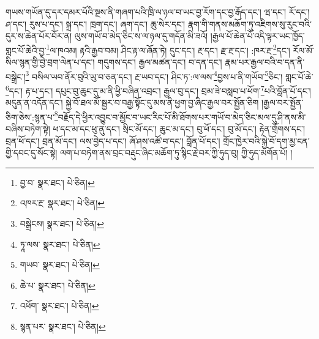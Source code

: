 གཡས་གཡོན་དུ་དར་དམར་པོའི་སྔས་ནི་གཞག་པའི་ཁྲི་ལ་ཉལ་བ་ཡང་བྱ་རོག་དང་བྱ་རྒོད་དང་། ཝ་དང་། རོ་དང་། ཤ་དང་། རུས་པ་དང་། སྐྲ་དང་། ཁྲག་དང་། ཞག་དང་། ཆུ་སེར་དང་། རྣག་གི་གནས་མཆོག་ཏུ་འཇིགས་སུ་རུང་བའི་དུར་ས་ཆེན་པོར་བོར་ན། ལུས་གཡོ་བ་མེད་ཅིང་ས་ལ་ཉལ་དུ་གདོན་མི་ཟའོ། །རྒྱལ་པོ་ཆེན་པོ་འདི་ལྟར་ཡང་ཁྱོད་གླང་པོ་ཆེའི་བྱ་\footnote{བྱ་བ་  སྣར་ཐང་།  པེ་ཅིན། }ལ་ཁའམ། རྟའི་རྒྱབ་བམ། ཤིང་རྟ་ལ་ཞོན་ཏེ། དུང་དང་། རྔ་དང་། རྫ་རྔ་དང་། :ཁར་རྔ་\footnote{འཁར་རྔ་  སྣར་ཐང་།  པེ་ཅིན། }དང་། རོལ་མོ་སིལ་སྙན་གྱི་བྱེ་བྲག་ལེན་པ་དང་། གདུགས་དང་། རྒྱལ་མཚན་དང་། བ་དན་དང་། རྣམ་པར་རྒྱལ་བའི་བ་དན་ནི་བསྒྲེང་།\footnote{བསྒྲེངས།  སྣར་ཐང་།  པེ་ཅིན། } བསིལ་ཡབ་ནོར་བུའི་ཡུ་བ་ཅན་དང་། རྔ་ཡབ་དང་། ཤིང་ཏ་:ལ་ལས་\footnote{ཏཱ་ལས་  སྣར་ཐང་།  པེ་ཅིན། }བྱས་པ་ནི་གཡོབ་\footnote{གཡབ་  སྣར་ཐང་།  པེ་ཅིན། }ཅིང་། གླང་པོ་ཆེ་\footnote{ཆེ་པ་  སྣར་ཐང་།  པེ་ཅིན། }དང་། རྟ་པ་དང་། དཔུང་བུ་ཆུང་དུ་མ་ནི་ཕྱི་བཞིན་འབྲང་། རྒྱལ་བུ་དང་། བྲམ་ཟེ་བསླབ་པ་ཕོག་\footnote{འཕོག་  སྣར་ཐང་།  པེ་ཅིན། }པའི་བློན་པོ་དང་། མདུན་ན་འདོན་དང་། སྐྱེ་བོ་ཐལ་མོ་སྦྱར་བ་བརྒྱ་སྟོང་དུ་མས་ནི་ཕྱག་བྱ་ཞིང་རྒྱལ་བར་སྤྱོན་ཅིག །རྒྱལ་བར་སྤྱོན་ཅིག་ཅེས་:སྙན་པ་\footnote{སྙན་པར་  སྣར་ཐང་།  པེ་ཅིན། }བརྗོད་དེ་ཕྱིར་འབྱུང་བ་མྱོང་བ་ཡང་རིང་པོ་མི་ཐོགས་པར་གཡོ་བ་མེད་ཅིང་མལ་དུ་ཤི་ནས་མི་བཞིས་བཏེག་སྟེ། ཕ་དང་མ་དང་ཕུ་ནུ་དང་། སྲིང་མོ་དང་། ཆུང་མ་དང་། བུ་ཕོ་དང་། བུ་མོ་དང་། རྟེན་གྲོགས་དང་། བྲན་ཕོ་དང་། བྲན་མོ་དང་། ལས་བྱེད་པ་དང་། ཞོ་ཤས་འཚོ་བ་དང་། བློན་པོ་དང་། གྲོང་ཁྱེར་བའི་སྐྱེ་བོ་དག་མྱ་ངན་གྱི་དབང་དུ་སོང་སྟེ། ལག་པ་བཏེག་ནས་བྲང་བརྡུང་ཞིང་མཆོག་ཏུ་སྙིང་རྗེ་བར་ཀྱི་ཧུད་བུ། ཀྱི་ཧུད་མགོན་པོ། །
